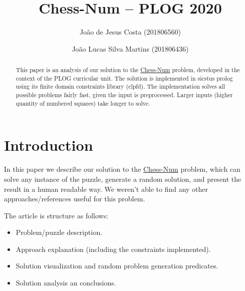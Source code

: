 \documentclass[runningheads]{llncs}
\title{Chess-Num -- PLOG 2020}
\author{João de Jesus Costa (201806560) \and João Lucas Silva Martins (201806436)}
\institute{FEUP-PLOG, Class 3MIEIC03, Group Chess-Num\_3}
\begin{document}
\maketitle

\begin{abstract}
This paper is an analysis of our solution to the  \href{https://erich-friedman.github.io/puzzle/chessnum/}{Chess-Num}
problem, developed in the context of the PLOG curricular unit. The solution is
implemented in sicstus prolog using its finite domain constraints library (clpfd).
The implementation solves all possible problems fairly fast, given the input
is preprocessed. Larger inputs (higher quantity of numbered squares) take longer
to solve.

\end{abstract}

\section{Introduction}
In this paper we describe our solution to the \href{https://erich-friedman.github.io/puzzle/chessnum/}{Chess-Num}
problem, which can solve any instance of the puzzle, generate a random solution, and
present the result in a human readable way. We weren't able to find any other
approaches/references useful for this problem.

The article is structure as follows:
\begin{itemize}
  \item Problem/puzzle description.
  \item Approach explanation (including the constraints implemented).
  \item Solution visualization and random problem generation predicates.
  \item Solution analysis an conclusions.
\end{itemize}
\end{document}
